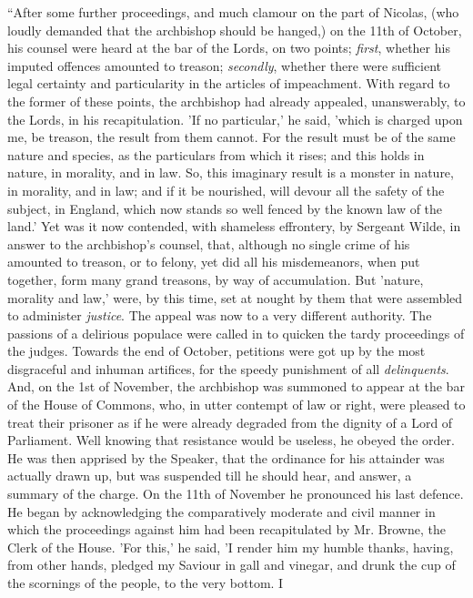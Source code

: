 ``After some further proceedings, and
much clamour on the part of Nicolas, (who loudly demanded that the
archbishop should be hanged,) on the 11th of October, his counsel were
heard at the bar of the Lords, on two points; \emph{first}, whether his
imputed offences amounted to treason; \emph{secondly}, whether there
were sufficient legal certainty and particularity in the articles of
impeachment. With regard to the former of these points, the archbishop
had already appealed, unanswerably, to the Lords, in his recapitulation.
'If no particular,' he said, 'which is charged upon me, be treason, the
result from them cannot. For the result must be of the same nature and
species, as the particulars from which it rises; and this holds in
nature, in morality, and in law. So, this imaginary result is a monster
in nature, in morality, and in law; and if it be nourished, will devour
all the safety of the subject, in England, which now stands so well
fenced by the known law of the land.' Yet was it now contended, with
shameless effrontery, by Sergeant Wilde, in answer to the archbishop's
counsel, that, although no single crime of his amounted to treason, or
to felony, yet did all his misdemeanors, when put together, form many
grand treasons, by way of accumulation. But 'nature, morality and law,'
were, by this time, set at nought by them that were assembled to
administer \emph{justice}. The appeal was now to a very different
authority. The passions of a delirious populace were called in to
quicken the tardy proceedings of the judges. Towards the end of October,
petitions were got up by the most disgraceful and inhuman artifices, for
the speedy punishment of all \emph{delinquents}. And, on the 1st of
November, the archbishop was summoned to appear at the bar of the House
of Commons, who, in utter contempt of law or
right, were pleased to treat their prisoner as if he were already
degraded from the dignity of a Lord of Parliament. Well knowing that
resistance would be useless, he obeyed the order. He was then apprised
by the Speaker, that the ordinance for his attainder was actually drawn
up, but was suspended till he should hear, and answer, a summary of the
charge. On the 11th of November he pronounced his last defence. He began
by acknowledging the comparatively moderate and civil manner in which
the proceedings against him had been recapitulated by Mr. Browne, the
Clerk of the House. 'For this,' he said, 'I render him my humble thanks,
having, from other hands, pledged my Saviour in gall and vinegar, and
drunk the cup of the scornings of the people, to the very bottom. I
